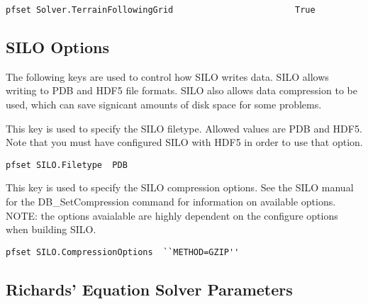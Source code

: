 \begin{display}\begin{verbatim}
pfset Solver.TerrainFollowingGrid                        True
\end{verbatim}\end{display}



\subsection{SILO Options}
\label{SILO Options}

The following keys are used to control how SILO writes data.  SILO
 allows writing to PDB and HDF5 file formats.  SILO also allows data
 compression to be used, which can save signicant amounts of disk
 space for some problems.  

{
This key is used to specify the SILO filetype.   Allowed values are PDB and HDF5.  Note that you must have configured SILO with HDF5 in order to use that option.}
\begin{display}\begin{verbatim}
pfset SILO.Filetype  PDB
\end{verbatim}\end{display}


{
This key is used to specify the SILO compression options. See the SILO manual for the
 DB\_SetCompression command for information on available options.   NOTE: the options avaialable are highly dependent on the configure options when building SILO.}
\begin{display}\begin{verbatim}
pfset SILO.CompressionOptions  ``METHOD=GZIP''
\end{verbatim}\end{display}



\subsection{Richards' Equation Solver Parameters}
\label{RE Solver Parameters}

